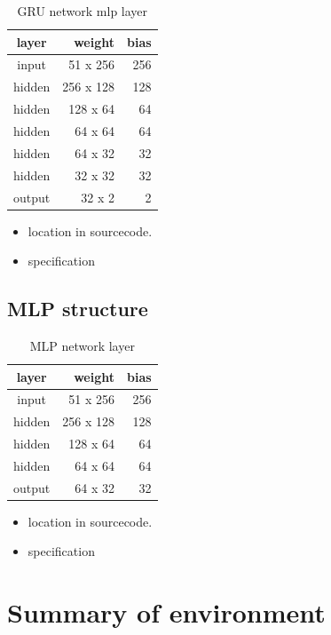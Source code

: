 \begin{table}[H]
\centering
\begin{tabular}{|c|r|r|}
\hline 
layer  & weight   & bias \\ \hline \hline
input  & 51 x 256 & 256  \\
hidden & 256 x 128 & 128 \\
hidden & 128 x 64  & 64  \\
hidden & 64 x 64   & 64  \\
hidden & 64 x 32   & 32  \\
hidden & 32 x 32   & 32  \\
output & 32 x 2    & 2  \\
\hline
\end{tabular} 
\caption{GRU network mlp layer}
\label{tab:reward_gru_mlp_network}
\end{table}


\begin{itemize}
\item location in sourcecode.
\item specification
\end{itemize}

\subsection{MLP structure}



\begin{table}[H]
\centering
\begin{tabular}{|c|r|r|}
\hline 
layer  & weight   & bias \\ \hline \hline
input  & 51 x 256 & 256  \\
hidden & 256 x 128 & 128 \\
hidden & 128 x 64  & 64  \\
hidden & 64 x 64   & 64  \\
output & 64 x 32   & 32  \\
\hline
\end{tabular} 
\caption{MLP network layer}
\label{tab:reward_mlp_network}
\end{table}



\begin{itemize}
\item location in sourcecode.
\item specification
\end{itemize}

\pagebreak
\section{Summary of environment}

